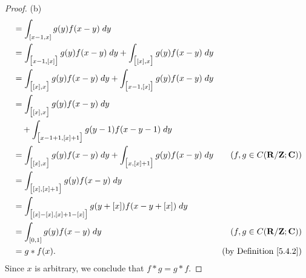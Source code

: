 \begin{proof}{(b)}
\begin{align*}
         & = \int_{[x - 1, x]} g(y) f(x - y) \; dy                                                                                              \\
         & = \int_{\big[x - 1, [x]\big]} g(y) f(x - y) \; dy + \int_{\big[[x], x\big]} g(y) f(x - y) \; dy                                      \\
         & = \int_{\big[[x], x\big]} g(y) f(x - y) \; dy + \int_{\big[x - 1, [x]\big]} g(y) f(x - y) \; dy                                      \\
         & = \int_{\big[[x], x\big]} g(y) f(x - y) \; dy                                                                                        \\
         & \quad + \int_{\big[x - 1 + 1, [x] + 1\big]} g(y - 1) f(x - y - 1) \; dy                                                              \\
         & = \int_{\big[[x], x\big]} g(y) f(x - y) \; dy + \int_{\big[x, [x] + 1\big]} g(y) f(x - y) \; dy & (f, g \in C(\mathbf{R} / \mathbf{Z} ; \mathbf{C}))         \\
         & = \int_{\big[[x], [x] + 1\big]} g(y) f(x - y) \; dy                                                                                  \\
         & = \int_{\big[[x] - [x], [x] + 1 - [x]\big]} g(y + [x]) f(x - y + [x]) \; dy                                                          \\
         & = \int_{[0, 1]} g(y) f(x - y) \; dy                                                             & (f, g \in C(\mathbf{R} / \mathbf{Z} ; \mathbf{C}))         \\
         & = g * f(x).                                                                                     & \text{(by Definition \ref{5.4.2})}
    \end{align*}
    Since \(x\) is arbitrary, we conclude that \(f * g = g * f\).
\end{proof}

